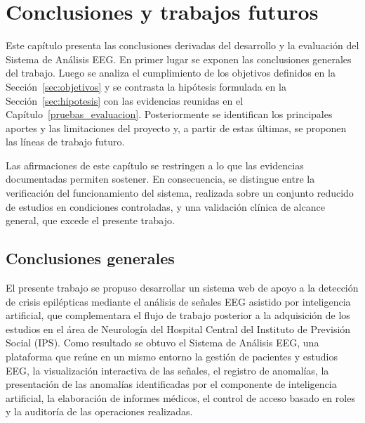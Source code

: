 \chapter{Conclusiones y trabajos futuros}
\label{chap:conclusiones}


Este capítulo presenta las conclusiones derivadas del desarrollo y la evaluación del Sistema de Análisis EEG.
En primer lugar se exponen las conclusiones generales del trabajo.
Luego se analiza el cumplimiento de los objetivos definidos en la Sección~\ref{sec:objetivos} y se contrasta la hipótesis formulada en la Sección~\ref{sec:hipotesis} con las evidencias reunidas en el Capítulo~\ref{pruebas_evaluacion}.
Posteriormente se identifican los principales aportes y las limitaciones del proyecto y, a partir de estas últimas, se proponen las líneas de trabajo futuro.

Las afirmaciones de este capítulo se restringen a lo que las evidencias documentadas permiten sostener.
En consecuencia, se distingue entre la verificación del funcionamiento del sistema, realizada sobre un conjunto reducido de estudios en condiciones controladas, y una validación clínica de alcance general, que excede el presente trabajo.


\section{Conclusiones generales}
\label{sec:conclusiones-generales}

El presente trabajo se propuso desarrollar un sistema web de apoyo a la detección de crisis epilépticas mediante el análisis de señales EEG asistido por inteligencia artificial, que complementara el flujo de trabajo posterior a la adquisición de los estudios en el área de Neurología del Hospital Central del Instituto de Previsión Social (IPS).
Como resultado se obtuvo el Sistema de Análisis EEG, una plataforma que reúne en un mismo entorno la gestión de pacientes y estudios EEG, la visualización interactiva de las señales, el registro de anomalías, la presentación de las anomalías identificadas por el componente de inteligencia artificial, la elaboración de informes médicos, el control de acceso basado en roles y la auditoría de las operaciones realizadas.

